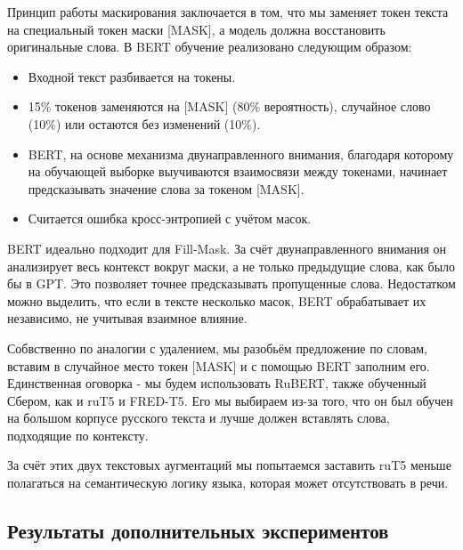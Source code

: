 Принцип работы маскирования заключается в том, что мы заменяет токен текста на специальный токен маски [MASK], а модель должна восстановить оригинальные слова. В BERT обучение реализовано следующим образом:
\begin{itemize}
  \item Входной текст разбивается на токены.
  \item 15\% токенов заменяются на [MASK] (80\% вероятность), случайное слово (10\%) или остаются без изменений (10\%).
  \item BERT, на основе механизма двунаправленного внимания, благодаря которому на обучающей выборке выучиваются взаимосвязи между токенами, начинает предсказывать значение слова за токеном [MASK].
  \item Считается ошибка кросс-энтропией с учётом масок.
\end{itemize}

BERT идеально подходит для Fill-Mask.
За счёт двунаправленного внимания он анализирует весь контекст вокруг маски, а не только предыдущие слова, как было бы в GPT.
Это позволяет точнее предсказывать пропущенные слова.  
Недостатком можно выделить, что если в тексте несколько масок, BERT обрабатывает их независимо, не учитывая взаимное влияние.  

Собвственно по аналогии с удалением, мы разобьём предложение по словам, вставим в случайное место токен [MASK] и с помощью BERT заполним его.
Единственная оговорка - мы будем использовать RuBERT\cite{zmitrovich2023family}, также обученный Сбером, как и ruT5 и FRED-T5.
Его мы выбираем из-за того, что он был обучен на большом корпусе русского текста и лучше должен вставлять слова, подходящие по контексту.

За счёт этих двух текстовых аугментаций мы попытаемся заставить ruT5 меньше полагаться на семантическую логику языка, которая может отсутствовать в речи.

\subsection{Результаты дополнительных экспериментов}

